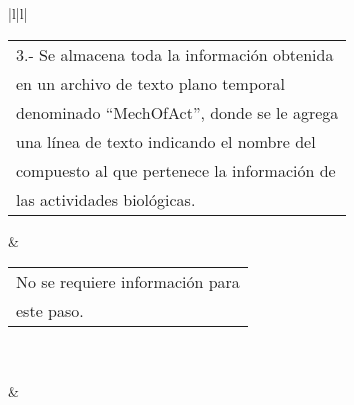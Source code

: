 \begin{longtable}{|l|l|}
\begin{tabular}[c]{@{}l@{}}3.- Se almacena toda la información obtenida\\ en un archivo de texto plano temporal\\ denominado “MechOfAct”, donde se le agrega\\ una línea de texto indicando el nombre del\\ compuesto al que pertenece la información de\\ las actividades biológicas.\end{tabular} & \begin{tabular}[c]{@{}l@{}}No se requiere información para\\ este paso.\end{tabular} \\ \hline
{}                                                                                                                                                                                                                                                                                                                                      \\ \hline
{}                                                                                                                                                                                                                                                                               &                                                                \\ \hline
{}                                                                                                                                                                                                                       \\ \hline
{}                                                                                                                                                                             \\ \hline

\end{longtable}
